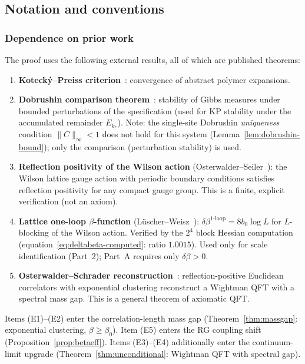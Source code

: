 \documentclass[11pt]{article}
\theoremstyle{definition}
\begin{document}
\subsection{Notation and conventions}

\subsubsection*{Dependence on prior work}

The proof uses the following external results, all of which are
published theorems:

\begin{enumerate}[nosep,label=(E\arabic*)]
\item \textbf{Koteck\'y--Preiss criterion}~\cite{KP}: convergence of
abstract polymer expansions.
\item \textbf{Dobrushin comparison
theorem}~\cite{Dobrushin}: stability of Gibbs measures
under bounded perturbations of the specification (used for
KP stability under the accumulated remainder $E_{k_*}$).
Note: the single-site Dobrushin \emph{uniqueness} condition
$\|C\|_\infty<1$ does not hold for this system
(Lemma~\ref{lem:dobrushin-bound}); only the comparison
(perturbation stability) is used.
\item \textbf{Reflection positivity of the Wilson action}
(Osterwalder--Seiler~\cite{OS78}): the Wilson lattice gauge
action with periodic boundary conditions satisfies reflection
positivity for any compact gauge group.  This is a finite,
explicit verification (not an axiom).
\item \textbf{Lattice one-loop $\beta$-function}
(L\"uscher--Weisz~\cite{Luscher82}):
$\delta\beta^{1\text{-loop}}=8b_0\log L$ for $L$-blocking
of the Wilson action.  Verified by the $2^4$ block Hessian
computation (equation~\eqref{eq:deltabeta-computed}:
ratio $1.0015$).  Used only for scale identification
(Part~2); Part~A requires only $\delta\beta>0$.
\item \textbf{Osterwalder--Schrader reconstruction}~\cite{OS73}:
reflection-positive Euclidean correlators with exponential
clustering reconstruct a Wightman QFT with a spectral
mass gap.  This is a general theorem of axiomatic QFT.
\end{enumerate}

\noindent Items (E1)--(E2) enter the correlation-length mass gap
(Theorem~\ref{thm:massgap}: exponential clustering, $\beta\ge\beta_0$).
Item (E5) enters the RG coupling shift
(Proposition~\ref{prop:betaeff}).
Items (E3)--(E4) additionally enter the continuum-limit upgrade
(Theorem~\ref{thm:unconditional}: Wightman QFT with spectral gap).
\end{document}
